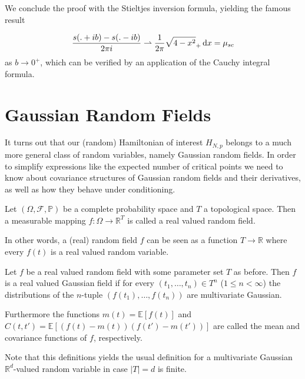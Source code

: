 We conclude the proof with the Stieltjes inversion formula, yielding the famous result

$$\frac{s(.+ib)-s(.-ib)}{2\pi i}\rightharpoonup\frac{1}{2\pi}\sqrt{4-x^2}_+\mathop{}\!\mathrm{d} x=\mu_{sc}$$
as $b\rightarrow 0^+$, which can be verified by an application of the Cauchy integral formula.









\section{Gaussian Random Fields}\label{sec:GRF}
It turns out that our (random) Hamiltonian of interest $H_{N,p}$ belongs to a much more general class of random variables, namely Gaussian random fields. In order to simplify expressions like the expected number of critical points we need to know about covariance structures of Gaussian random fields and their derivatives, as well as how they behave under conditioning.

\begin{definition}
	Let $(\Omega,\mathcal F, \mathbb P)$ be a complete probability space and $T$ a topological space. Then a measurable mapping $f:\Omega\rightarrow\mathbb R^T$ is called a real valued random field.
	
\end{definition}

In other words, a (real) random field $f$ can be seen as a function $T\rightarrow\mathbb R$ where every $f(t)$ is a real valued random variable.

\begin{definition}
	Let $f$ be a real valued random field with some parameter set $T$ as before. Then $f$ is a real valued Gaussian field if for every $(t_1,\dots,t_n)\in T^n$ ($1\leq n <\infty$) the distributions of the $n$-tuple $(f(t_1),\dots,f(t_n))$ are multivariate Gaussian.
	
	Furthermore the functions $m(t)=\mathbb E[f(t)]$ and \newline$C(t,t')=\mathbb E[(f(t)-m(t))(f(t')-m(t'))]$ are called the mean and covariance functions of $f$, respectively.
\end{definition}
Note that this definitions yields the usual definition for a multivariate Gaussian $\mathbb R^d$-valued random variable in case $|T|=d$ is finite.


